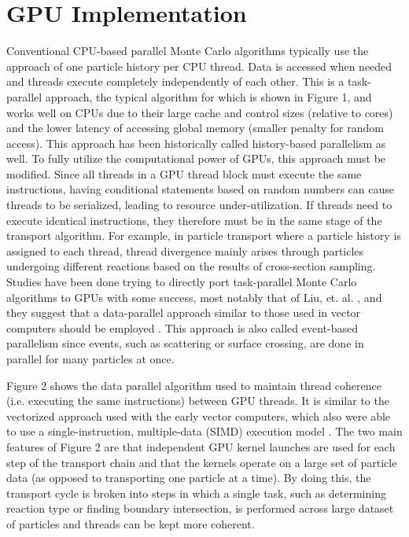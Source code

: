 \chapter{GPU Implementation}

Conventional CPU-based parallel Monte Carlo algorithms typically use the approach of one particle history per CPU thread.  Data is accessed when needed and threads execute completely independently of each other.  This is a task-parallel approach, the typical algorithm for which is shown in Figure 1, and works well on CPUs due to their large cache and control sizes (relative to cores) and the lower latency of accessing global memory (smaller penalty for random access).  This approach has been historically called history-based parallelism as well.  To fully utilize the computational power of GPUs, this approach must be modified.  Since all threads in a GPU thread block must execute the same instructions, having conditional statements based on random numbers can cause threads to be serialized, leading to resource under-utilization.  If threads need to execute identical instructions, they therefore must be in the same stage of the transport algorithm.  For example, in particle transport where a particle history is assigned to each thread, thread divergence mainly arises through particles undergoing different reactions based on the results of cross-section sampling.    Studies have been done trying to directly port task-parallel Monte Carlo algorithms to GPUs with some success, most notably that of Liu, et. al. \cite{tianyu}, and they suggest that a data-parallel approach similar to those used in vector computers should be employed \cite{tianyu,vector}.  This approach is also called event-based parallelism since events, such as scattering or surface crossing, are done in parallel for many particles at once.  

Figure 2 shows the data parallel algorithm used to maintain thread coherence (i.e. executing the same instructions) between GPU threads.  It is similar to the vectorized approach used with the early vector computers, which also were able to use a single-instruction, multiple-data (SIMD) execution model \cite{vector,vujic_vector}.  The two main features of Figure 2 are that independent GPU kernel launches are used for each step of the transport chain and that the kernels operate on a large set of particle data (as opposed to transporting one particle at a time).  By doing this, the transport cycle is broken into steps in which a single task, such as determining reaction type or finding boundary intersection, is performed across large dataset of particles and threads can be kept more coherent.

